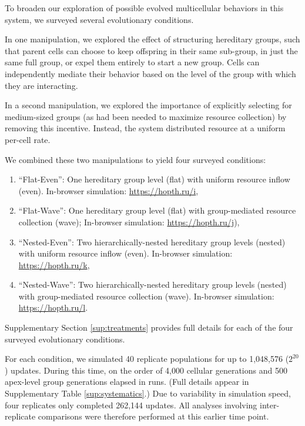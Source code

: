 To broaden our exploration of possible evolved multicellular behaviors in this system, we surveyed several evolutionary conditions.

In one manipulation, we explored the effect of structuring hereditary groups, such that parent cells can choose to keep offspring in their same sub-group, in just the same full group, or expel them entirely to start a new group.
Cells can independently mediate their behavior based on the level of the group with which they are interacting.

In a second manipulation, we explored the importance of explicitly selecting for medium-sized groups (as had been needed to maximize resource collection) by removing this incentive.
Instead, the system distributed resource at a uniform per-cell rate.

We combined these two manipulations to yield four surveyed conditions:
\begin{enumerate}
\item ``Flat-Even'': One hereditary group level (flat) with uniform resource inflow (even). In-browser simulation: \url{https://hopth.ru/i},
\item ``Flat-Wave'': One  hereditary group level (flat) with group-mediated resource collection (wave); In-browser simulation: \url{https://hopth.ru/j}),
\item ``Nested-Even'': Two hierarchically-nested hereditary group levels (nested) with uniform resource inflow (even). In-browser simulation: \url{https://hopth.ru/k},
\item ``Nested-Wave'': Two hierarchically-nested hereditary group levels (nested) with group-mediated resource collection (wave). In-browser simulation: \url{https://hopth.ru/l}.
\end{enumerate}

Supplementary Section \ref{sup:treatments} provides full details for each of the four surveyed evolutionary conditions.

For each condition, we simulated 40 replicate populations for up to
1,048,576 ($2^{20}$) updates.
During this time, on the order of 4,000 cellular generations and 500 apex-level group generations elapsed in runs.
(Full details appear in Supplementary Table \ref{sup:systematics}.)
Due to variability in simulation speed, four replicates only completed 262,144 updates.
All analyses involving inter-replicate comparisons were therefore performed at this earlier time point.
